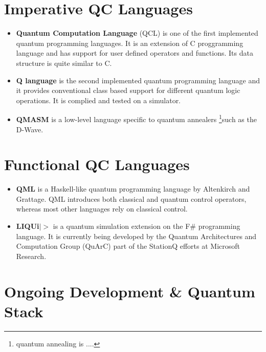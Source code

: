 \section{Imperative QC Languages}
\begin{itemize}
\item{
\textbf{Quantum Computation Language} (QCL) is one of the first implemented quantum programming languages. It is an extension of C proggramming language and has support for user defined operators and functions. Its data structure is quite similar to C.
}
\item{
	\textbf{Q language} is the second implemented quantum programming language and it provides conventional class based support for different quantum logic operations. It is complied and tested on a simulator.
}
\item{
	\textbf{QMASM} is a low-level language specific to quantum annealers \footnote{quantum annealing is ....}such as the D-Wave.
}
\end{itemize}

\section{Functional QC Languages}
\begin{itemize}
\item{
\textbf{QML} is a Haskell-like quantum programming language by Altenkirch and Grattage. QML introduces both classical and quantum control operators, whereas most other languages rely on classical control. 
}
\item{
	\textbf{LIQUi$|>$} is a quantum simulation extension on the F\# programming language. It is currently being developed by the Quantum Architectures and Computation Group (QuArC) part of the StationQ efforts at Microsoft Research.
}
\end{itemize}
\section{Ongoing Development \& Quantum Stack}

